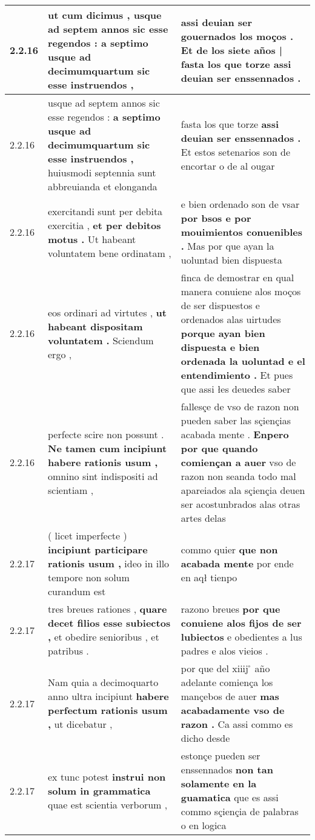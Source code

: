 \begin{tabular}{|p{1cm}|p{6.5cm}|p{6.5cm}|}
2.2.16 & ut cum dicimus , \textbf{ usque ad septem annos sic esse regendos : } a septimo usque ad decimumquartum sic esse instruendos , & assi deuian ser gouernados los moços . \textbf{ Et de los siete años | fasta los que torze } assi deuian ser enssennados . \\\hline
2.2.16 & usque ad septem annos sic esse regendos : \textbf{ a septimo usque ad decimumquartum sic esse instruendos , } huiusmodi septennia sunt abbreuianda et elonganda & fasta los que torze \textbf{ assi deuian ser enssennados . } Et estos setenarios son de encortar o de al ougar \\\hline
2.2.16 & exercitandi sunt per debita exercitia , \textbf{ et per debitos motus . } Ut habeant voluntatem bene ordinatam , & e bien ordenado son de vsar \textbf{ por bsos e por mouimientos conuenibles . } Mas por que ayan la uoluntad bien dispuesta \\\hline
2.2.16 & eos ordinari ad virtutes , \textbf{ ut habeant dispositam voluntatem . } Sciendum ergo , & finca de demostrar en qual manera conuiene alos moços de ser dispuestos e ordenados alas uirtudes \textbf{ porque ayan bien dispuesta e bien ordenada la uoluntad e el entendimiento . } Et pues que assi łes deuedes saber \\\hline
2.2.16 & perfecte scire non possunt . \textbf{ Ne tamen cum incipiunt habere rationis usum , } omnino sint indispositi ad scientiam , & fallesçe de vso de razon non pueden saber las sçiençias acabada mente . \textbf{ Enpero por que quando comiençan a auer } vso de razon non seanda todo mal apareiados ala sçiençia deuen ser acostunbrados alas otras artes delas \\\hline
2.2.17 & ( licet imperfecte ) \textbf{ incipiunt participare rationis usum , } ideo in illo tempore non solum curandum est & commo quier \textbf{ que non acabada mente } por ende en aqł tienpo \\\hline
2.2.17 & tres breues rationes , \textbf{ quare decet filios esse subiectos , } et obedire senioribus , et patribus . & razono breues \textbf{ por que conuiene alos fijos de ser lubiectos } e obedientes a lus padres e alos vieios . \\\hline
2.2.17 & Nam quia a decimoquarto anno ultra incipiunt \textbf{ habere perfectum rationis usum , } ut dicebatur , & por que del xiiij ̊ año adelante comiença los mançebos de auer \textbf{ mas acabadamente vso de razon . } Ca assi commo es dicho desde \\\hline
2.2.17 & ex tunc potest \textbf{ instrui non solum in grammatica } quae est scientia verborum , & estonçe pueden ser enssennados \textbf{ non tan solamente en la guamatica } que es assi commo sçiençia de palabras o en logica \\\hline

\end{tabular}
